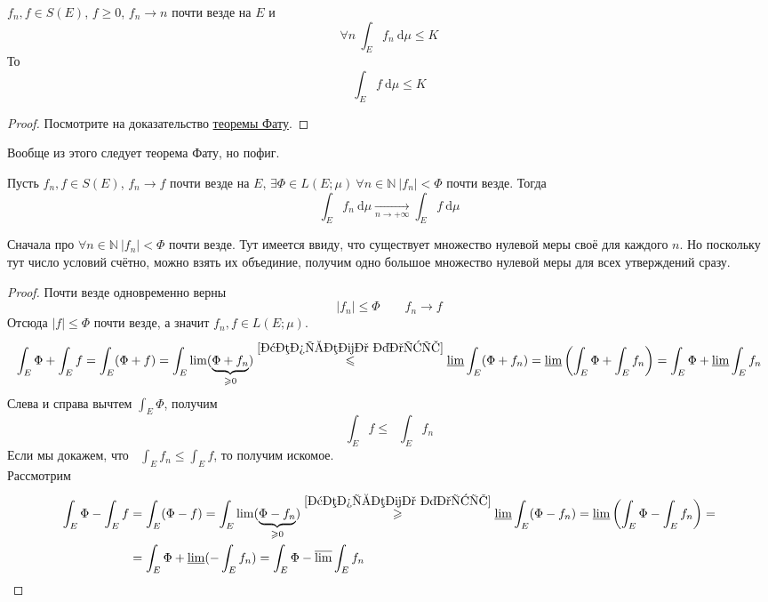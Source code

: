\documentclass{article}
\DeclareMathOperator*{\limsup}{\overline{\lim}}
\DeclareMathOperator*{\liminf}{\underline{\lim}}
\begin{document}
    \begin{corollary}
        $f_n,f\in S(E)$, $f\geqslant0$, $f_n\rightarrow n$ почти везде на $E$ и
        $$
        \forall n~\int_E f_n~\mathrm d\mu\leqslant K
        $$
        То
        $$
        \int_E f~\mathrm d\mu\leqslant K
        $$
    \end{corollary}
    \begin{proof}
        Посмотрите на доказательство \hyperref[Теорема Фату]{теоремы Фату}.
    \end{proof}
    \begin{remark}
        Вообще из этого следует теорема Фату, но пофиг.
    \end{remark}
    \begin{theorem}
        \label{Теорема Лебега о мажорированной сходимости}
        Пусть $f_n,f\in S(E)$, $f_n\rightarrow f$ почти везде на $E$, $\exists \Phi\in L(E;\mu)~\forall n\in\mathbb N~|f_n|<\Phi$ почти везде. Тогда
        $$
        \int_Ef_n~\mathrm d\mu\underset{n\to+\infty}\longrightarrow\int_Ef~\mathrm d\mu
        $$
    \end{theorem}
    \begin{remark}
        Сначала про $\forall n\in\mathbb N~|f_n|<\Phi$ почти везде. Тут имеется ввиду, что существует множество нулевой меры своё для каждого $n$. Но поскольку тут число условий счётно, можно взять их объединие, получим одно большое множество нулевой меры для всех утверждений сразу.
    \end{remark}
    \begin{proof}
        Почти везде одновременно верны
        $$
        |f_n|\leqslant\Phi\qquad f_n\rightarrow f
        $$
        Отсюда $|f|\leqslant\Phi$ почти везде, а значит $f_n,f\in L(E;\mu)$.
        $$
        \int_E\Phi+\int_Ef=\int_E(\Phi+f)=\int_E\lim(\underbrace{\Phi+f_n}_{\geqslant0})\overset{\ref{Теорема Фату}}\leqslant\liminf\int_E(\Phi+f_n)=\liminf\left(\int_E\Phi+\int_Ef_n\right)=\int_E\Phi+\liminf\int_Ef_n
        $$
        Слева и справа вычтем $\int_E\Phi$, получим
        $$
        \int_Ef\leqslant\liminf\int_Ef_n
        $$
        Если мы докажем, что $\limsup\int_Ef_n\leqslant\int_Ef$, то получим искомое.\\
        Рассмотрим
        \[\begin{split}
            \int_E\Phi-\int_Ef&=\int_E(\Phi-f)=\int_E\lim(\underbrace{\Phi-f_n}_{\geqslant0})\overset{\ref{Теорема Фату}}\geqslant\liminf\int_E(\Phi-f_n)=\liminf\left(\int_E\Phi-\int_E f_n\right)=\\
            &=\int_E\Phi+\liminf(-\int_Ef_n)=\int_E\Phi-\limsup\int_Ef_n
        \end{split}\]
    \end{proof}
\end{document}
